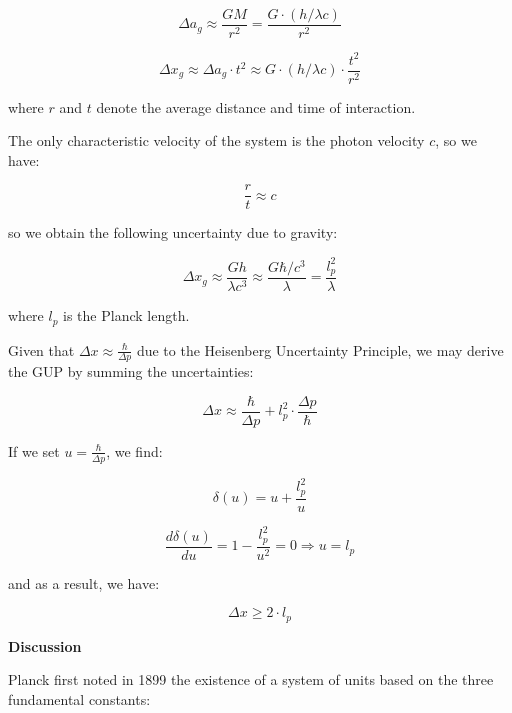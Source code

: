 \documentclass{article}
\begin{document}
\begin{equation}
\Delta a_g \approx \frac{GM}{r^2} = \frac{G \cdot (h/\lambda c)}{r^2}
\end{equation}

\begin{equation}
\Delta x_g \approx \Delta a_g \cdot t^2 \approx G \cdot (h/\lambda c) \cdot \frac{t^2}{r^2}
\end{equation}

where $r$ and $t$ denote the average distance and time of interaction.

The only characteristic velocity of the system is the photon velocity $c$, so we have:

\begin{equation}
\frac{r}{t} \approx c
\end{equation}

so we obtain the following uncertainty due to gravity:

\begin{equation}
\Delta x_g \approx \frac{Gh}{\lambda c^3} \approx \frac{G \hbar/ c^3}{\lambda} = \frac{l_p^2}{\lambda}
\end{equation}

where $l_p$ is the Planck length.

Given that $\Delta x \approx \frac{\hbar}{\Delta p}$ due to the Heisenberg Uncertainty Principle, we may derive the GUP by summing the uncertainties:

\begin{equation}
\Delta x \approx \frac{\hbar}{\Delta p} + l_p^2 \cdot \frac{\Delta p}{\hbar}
\end{equation}

If we set $u = \frac{\hbar}{\Delta p}$, we find:

\begin{equation}
\delta (u) = u + \frac{l_p^2}{u}
\end{equation}

\begin{equation}
\frac{d \delta (u)}{d u} = 1 - \frac{l_p^2}{u^2} = 0 \Rightarrow u = l_p
\end{equation}

and as a result, we have:

\begin{equation}
\Delta x \geq 2 \cdot l_p
\end{equation}

\textbf{Discussion}

Planck first noted in 1899 the existence of a system of units based on the three fundamental constants:
\end{document}

